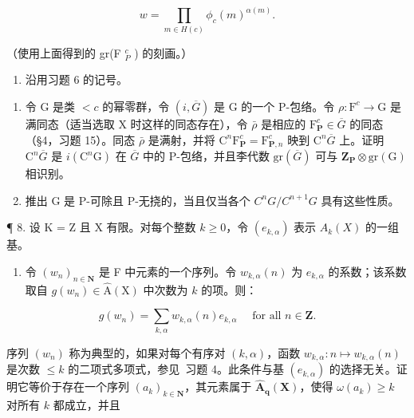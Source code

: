 \[
w = \prod_ {m \in H (c)} \phi_ {c} (m) ^ {\alpha (m)}.
\]

（使用上面得到的 gr(F \(_{P}^{c}\) ) 的刻画。）

\begin{enumerate}
\def\labelenumi{\arabic{enumi}.}
\setcounter{enumi}{6}
\tightlist
\item
  沿用习题 6 的记号。
\end{enumerate}

\begin{enumerate}
\def\labelenumi{(\alph{enumi})}
\item
  令 G 是类 \(<c\) 的幂零群，令 \((i, \overline{G})\) 是 G 的一个 P-包络。令 \(\rho: \mathrm{F}^{c} \to \mathrm{G}\) 是满同态（适当选取 X 时这样的同态存在），令 \(\bar{\rho}\) 是相应的 \(\mathrm{F}_{\mathbf{P}}^{c} \in \overline{G}\) 的同态（§4，习题 15）。同态 \(\bar{\rho}\) 是满射，并将 \(\mathrm{C}^{n}\mathrm{F}_{\mathbf{P}}^{c} = \mathrm{F}_{\mathbf{P}, n}^{c}\) 映到 \(\mathrm{C}^{n}\overline{G}\) 上。证明 \(\mathrm{C}^{n}\overline{G}\) 是 \(i(\mathrm{C}^{n}\mathrm{G})\) 在 \(\overline{G}\) 中的 P-包络，并且李代数 \(\mathrm{gr}(\overline{G})\) 可与 \(\mathbf{Z}_{\mathbf{P}} \otimes \mathrm{gr}(\mathrm{G})\) 相识别。
\item
  推出 G 是 P-可除且 P-无挠的，当且仅当各个 \(C^{n}G/C^{n+1}G\) 具有这些性质。
\end{enumerate}

¶ 8. 设 K = Z 且 X 有限。对每个整数 \(k \geqslant 0\)，令 \((e_{k,\alpha})\) 表示 \(A_k(X)\) 的一组基。

\begin{enumerate}
\def\labelenumi{(\alph{enumi})}
\tightlist
\item
  令 \((w_{n})_{n\in \mathbf{N}}\) 是 F 中元素的一个序列。令 \(w_{k,\alpha}(n)\) 为 \(e_{k,\alpha}\) 的系数；该系数取自 \(g(w_{n})\in \hat{\mathrm{A}} (\mathrm{X})\) 中次数为 \(k\) 的项。则：
\end{enumerate}

\[
g (w _ {n}) = \sum_ {k, \alpha} w _ {k, \alpha} (n) e _ {k, \alpha} \quad \text { for   all } n \in \mathbf {Z}.
\]

序列 \((w_{n})\) 称为典型的，如果对每个有序对 \((k,\alpha)\)，函数 \(w_{k,\alpha}\colon n\mapsto w_{k,\alpha}(n)\) 是次数 \(\leqslant k\) 的二项式多项式，参见~习题 4。此条件与基 \((e_{k,\alpha})\) 的选择无关。证明它等价于存在一个序列 \((a_{k})_{k\in \mathbf{N}}\)，其元素属于 \(\hat{\mathbf{A}}_{\mathbf{q}}(\mathbf{X})\)，使得 \(\omega (a_k)\geqslant k\) 对所有 \(k\) 都成立，并且

